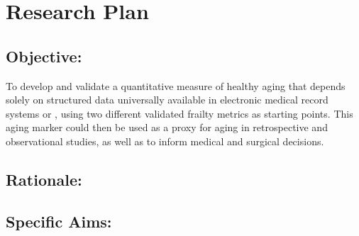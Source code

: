 \section{Research Plan }\label{research-plan}


\subsection{Objective:}\label{objective}
  
To develop and validate a quantitative measure of healthy aging that depends solely on structured data universally available in electronic medical record systems or ,
using two different validated frailty metrics as starting points. This
aging marker could then be used as a proxy for aging in retrospective
and observational studies, as well as to inform medical and surgical
decisions.


\subsection{Rationale:}\label{rationale}

\subsection{Specific Aims:}\label{specific-aims}
